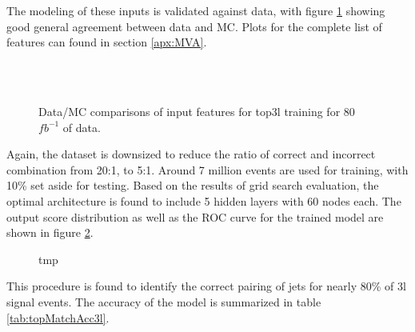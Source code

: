 The modeling of these inputs is validated against data, with figure \ref{fig:model_top3l} showing good general agreement between data and MC. Plots for the complete list of features can found in section \ref{apx:MVA}.

\begin{figure}[h!]                                                                                                         
    \\
    \\
    \caption{Data/MC comparisons of input features for top3l training for 80 $fb^{-1}$ of data.}
    \label{fig:model_top3l}
\end{figure}

Again, the dataset is downsized to reduce the ratio of correct and incorrect combination from 20:1, to 5:1. Around 7 million events are used for training, with 10\% set aside for testing. Based on the results of grid search evaluation, the optimal architecture is found to include 5 hidden layers with 60 nodes each. The output score distribution as well as the ROC curve for the trained model are shown in figure \ref{fig:top3lresults}.

\begin{figure}                                                                                                           
   \label{fig:top3lresults}                                                                                               
   \caption{tmp}
\end{figure}

This procedure is found to identify the correct pairing of jets for nearly 80\% of 3l signal events. The accuracy of the model is summarized in table \ref{tab:topMatchAcc3l}.

